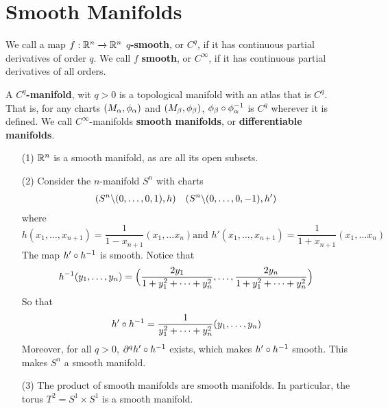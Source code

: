 \section{Smooth Manifolds}

\begin{definition}
    We call a map $f:\mathbb{R}^n \xrightarrow{} \mathbb{R}^n$ \textbf{$q$-smooth}, or $C^q$, if
    it has continuous partial derivatives of order  $q$. We call  $f$
    \textbf{smooth}, or $C^\infty$, if it has continuous partial derivatives of
    all orders.
\end{definition}

\begin{definition}
    A \textbf{$C^q$-manifold}, wit $q>0$ is a topological manifold with an
    atlas that is  $C^q$. That is, for any charts  $(M_\alpha,\phi_\alpha)$ and
    $(M_\beta,\phi_\beta)$, $\phi_\beta \circ \phi_\alpha^{-1}$ is $C^q$ wherever it is
    defined. We call  $C^\infty$-manifolds  \textbf{smooth manifolds}, or
    \textbf{differentiable manifolds}.
\end{definition}

\begin{example}\label{example_1.6}
    \begin{enumerate}
        \item[(1)] $\mathbb{R}^n$ is a smooth manifold, as are all its open subsets.

        \item[(2)] Consider the $n$-manifold  $S^n$ with charts
            \begin{align*}
                (S^n \backslash (0, \dots, 0,1),h) && (S^n \backslash (0, \dots, 0,-1),h')  \\
            \end{align*}
            where
            \begin{equation*}
                h(x_1, \dots,x_{n+1})=\frac{1}{1-x_{n+1}}(x_1, \dots x_n) \text{
                and } h'(x_1, \dots,x_{n+1})=\frac{1}{1+x_{n+1}}(x_1, \dots x_n)
            \end{equation*}
            The map $h' \circ h^{-1}$ is smooth. Notice that
            \begin{equation*}
                h^{-1}(y_1, \dots,y_n)=\Big{(}\frac{2y_1}{1+y_1^2+\dots+y_n^2},
                \dots, \frac{2y_n}{1+y_1^2+\dots+y_n^2}\Big{)}
            \end{equation*}
            So that
            \begin{equation*}
                h' \circ h^{-1}=\frac{1}{y_1^2+\dots+y_n^2}(y_1, \dots, y_n)
            \end{equation*}
            Moreover, for all $q>0$, $\partial^q{h' \circ h^{-1}}$ exists,
            which makes $h' \circ h^{-1}$ smooth. This makes $S^n$ a smooth
            manifold.

        \item[(3)] The product of smooth manifolds are smooth manifolds. In
            particular, the torus $T^2=S^1 \times S^1$ is a smooth manifold.
    \end{enumerate}
\end{example}

